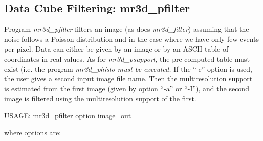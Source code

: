 \subsection{Data Cube Filtering: mr3d\_pfilter}
Program {\em mr3d\_pfilter} filters an image (as does {\em mr3d\_filter})
assuming  that the noise follows a Poisson distribution and in the case 
where we have only few events per pixel.
Data can either be given by an image or by 
an ASCII table of coordinates in real values.
As for {\em mr3d\_psupport}, the pre-computed table must exist (i.e.
the program {\em mr3d\_phisto must be executed.}
If the ``-c'' option is used, the user gives a second input image file name.
Then the multiresolution support is estimated from the first image
(given by option ``-a'' or ``-I''), and the second image is filtered
using the multiresolution support of the first.
{\bf
\begin{center}
 USAGE: mr3d\_pfilter option image\_out
\end{center}}
where options are:
